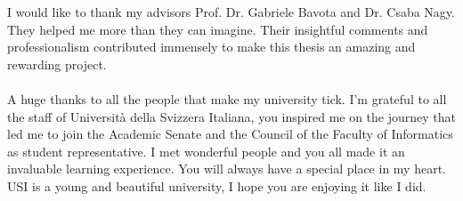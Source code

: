 \documentclass[11pt, mscthesis]{usiinfthesis}
\begin{document}
\begin{abstract}


\end{abstract}


\begin{acknowledgements}
I would like to thank my advisors Prof. Dr. Gabriele Bavota and Dr. Csaba Nagy. They helped me more than they can imagine. Their insightful comments and professionalism contributed immensely to make this thesis an amazing and rewarding project.
\\
\\
A huge thanks to all the people that make my university tick. I'm grateful to all the staff of Universit\`a della Svizzera Italiana, you inspired me on the journey that led me to join the Academic Senate and the Council of the Faculty of Informatics as student representative. I met wonderful people and you all made it an invaluable learning experience. You will always have a special place in my heart. USI is a young and beautiful university, I hope you are enjoying it like I did.



\end{acknowledgements}

\tableofcontents 
\listoffigures %
\listoftables %

\mainmatter










\appendix


\end{document}
